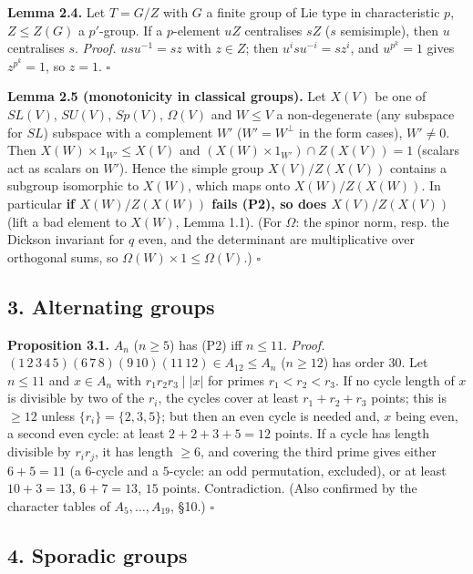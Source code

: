 \documentclass[11pt,a4paper]{article}
\begin{document}
\textbf{Lemma 2.4.} Let \(T=G/Z\) with \(G\) a finite group of Lie type
in characteristic \(p\), \(Z\le Z(G)\) a \(p'\)-group. If a
\(p\)-element \(uZ\) centralises \(sZ\) (\(s\) semisimple), then \(u\)
centralises \(s\). \emph{Proof.} \(usu^{-1}=sz\) with \(z\in Z\); then
\(u^isu^{-i}=sz^i\), and \(u^{p^k}=1\) gives \(z^{p^k}=1\), so \(z=1\).
\(\square\)

\textbf{Lemma 2.5 (monotonicity in classical groups).} Let \(X(V)\) be
one of \(SL(V)\), \(SU(V)\), \(Sp(V)\), \(\Omega(V)\) and \(W\le V\) a
non-degenerate (any subspace for \(SL\)) subspace with a complement
\(W'\) (\(W'=W^\perp\) in the form cases), \(W'\neq 0\). Then
\(X(W)\times 1_{W'}\le X(V)\) and \((X(W)\times 1_{W'})\cap Z(X(V))=1\)
(scalars act as scalars on \(W'\)). Hence the simple group
\(X(V)/Z(X(V))\) contains a subgroup isomorphic to \(X(W)\), which maps
onto \(X(W)/Z(X(W))\). In particular \textbf{if \(X(W)/Z(X(W))\) fails
(P2), so does \(X(V)/Z(X(V))\)} (lift a bad element to \(X(W)\), Lemma
1.1). (For \(\Omega\): the spinor norm, resp. the Dickson invariant for
\(q\) even, and the determinant are multiplicative over orthogonal sums,
so \(\Omega(W)\times 1\le\Omega(V)\).) \(\square\)

\subsection{3. Alternating groups}\label{alternating-groups}

\textbf{Proposition 3.1.} \(A_n\) (\(n\ge5\)) has (P2) iff \(n\le 11\).
\emph{Proof.}
\((1\,2\,3\,4\,5)(6\,7\,8)(9\,10)(11\,12)\in A_{12}\le A_n\)
(\(n\ge12\)) has order \(30\). Let \(n\le 11\) and \(x\in A_n\) with
\(r_1r_2r_3\mid |x|\) for primes \(r_1<r_2<r_3\). If no cycle length of
\(x\) is divisible by two of the \(r_i\), the cycles cover at least
\(r_1+r_2+r_3\) points; this is \(\ge 12\) unless \(\{r_i\}=\{2,3,5\}\);
but then an even cycle is needed and, \(x\) being even, a second even
cycle: at least \(2+2+3+5=12\) points. If a cycle has length divisible
by \(r_ir_j\), it has length \(\ge 6\), and covering the third prime
gives either \(6+5=11\) (a \(6\)-cycle and a \(5\)-cycle: an odd
permutation, excluded), or at least \(10+3=13\), \(6+7=13\), \(15\)
points. Contradiction. (Also confirmed by the character tables of
\(A_5,\dots,A_{19}\), §10.) \(\square\)

\subsection{4. Sporadic groups}\label{sporadic-groups}
\end{document}
